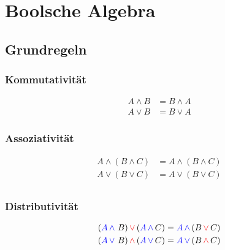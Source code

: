 \section{Boolsche Algebra}
\subsection{Grundregeln}
\subsubsection{Kommutativität}
\begin{align*}
    A \land B &= B \land A\\
    A \lor B &= B \lor A
\end{align*}
\subsubsection{Assoziativität}
\begin{align*}
    A \land (B \land C) &= A \land (B \land C)\\
    A \lor (B \lor C) &= A \lor (B \lor C)\\
\end{align*}
\subsubsection{Distributivität}
\begin{align*}
    (\textcolor{blue}{A\,\land}~B)\,\textcolor{red}{\lor}\,(\textcolor{blue}{A\,\land}\,C) &= \textcolor{blue}{A\,\land}\,(B\,\textcolor{red}{\lor}\,C)\\
    (\textcolor{blue}{A\,\lor}~B)\,\textcolor{red}{\land}\,(\textcolor{blue}{A\,\lor}\,C) &= \textcolor{blue}{A\,\lor}\,(B\,\textcolor{red}{\land}\,C)\\
\end{align*}

